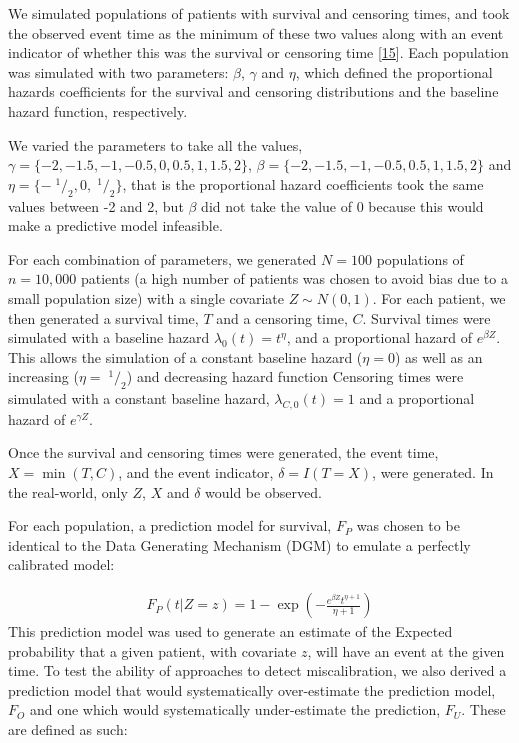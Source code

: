 \documentclass[12pt,PhD,twoside,openright]{muthesis}
\newcommand{\sfrac}[2]{\;^{#1}/_{#2}}
\begin{document}
We simulated populations of patients with survival and censoring times, and took the observed event time as the minimum of these two values along with an event indicator of whether this was the survival or censoring time {[}\protect\hyperlink{ref-burton_design_2006}{15}{]}. Each population was simulated with two parameters: \(\beta\), \(\gamma\) and \(\eta\), which defined the proportional hazards coefficients for the survival and censoring distributions and the baseline hazard function, respectively.

We varied the parameters to take all the values,\(\gamma = \{-2,-1.5,-1,-0.5,0,0.5,1,1.5,2\}\), \(\beta = \{-2,-1.5,-1,-0.5,0.5,1,1.5,2\}\) and \(\eta = \{-\sfrac{1}{2},0,\sfrac{1}{2}\}\), that is the proportional hazard coefficients took the same values between -2 and 2, but \(\beta\) did not take the value of 0 because this would make a predictive model infeasible.

For each combination of parameters, we generated \(N = 100\) populations of \(n = 10,000\) patients (a high number of patients was chosen to avoid bias due to a small population size) with a single covariate \(Z \sim N(0,1)\). For each patient, we then generated a survival time, \(T\) and a censoring time, \(C\). Survival times were simulated with a baseline hazard \(\lambda_0(t) = t^{\eta}\), and a proportional hazard of \(e^{\beta Z}\). This allows the simulation of a constant baseline hazard (\(\eta = 0\)) as well as an increasing (\(\eta = \sfrac{1}{2}\)) and decreasing hazard function Censoring times were simulated with a constant baseline hazard, \(\lambda_{C,0}(t) = 1\) and a proportional hazard of \(e^{\gamma Z}\).

Once the survival and censoring times were generated, the event time, \(X = \min(T,C)\), and the event indicator, \(\delta = I(T=X)\), were generated. In the real-world, only \(Z\), \(X\) and \(\delta\) would be observed.

For each population, a prediction model for survival, \(F_P\) was chosen to be identical to the Data Generating Mechanism (DGM) to emulate a perfectly calibrated model:

\[
\begin{array}{c}
F_P(t|Z = z) = 1 - \exp\left(-\frac{e^{\beta Z}t^{\eta+1}}{\eta+1}\right)
\end{array}
\]
This prediction model was used to generate an estimate of the Expected probability that a given patient, with covariate \(z\), will have an event at the given time. To test the ability of approaches to detect miscalibration, we also derived a prediction model that would systematically over-estimate the prediction model, \(F_O\) and one which would systematically under-estimate the prediction, \(F_U\). These are defined as such:
\end{document}
